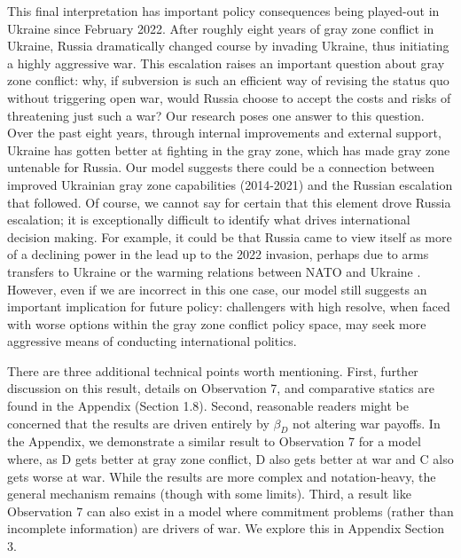 \documentclass[11pt,letterpaper,pdftex,dvipsnames,table]{article}
\begin{document}
This final interpretation has important policy consequences being played-out in Ukraine since February 2022. After roughly eight years of gray zone conflict in Ukraine, Russia dramatically changed course by invading Ukraine, thus initiating a highly aggressive war. This escalation raises an important question about gray zone conflict: why, if subversion is such an efficient way of revising the status quo without triggering open war, would Russia choose to accept the costs and risks of threatening just such a war? Our research poses one answer to this question. Over the past eight years, through internal improvements and external support, Ukraine has gotten better at fighting in the gray zone, which has made gray zone untenable for Russia. Our model suggests there could be a connection between improved Ukrainian gray zone capabilities (2014-2021) and the Russian escalation that followed. Of course, we cannot say for certain that this element drove Russia escalation; it is exceptionally difficult to identify what drives international decision making. For example, it could be that Russia came to view itself as more of a declining power in the lead up to the 2022 invasion, perhaps due to arms transfers to Ukraine or the warming relations between NATO and Ukraine \citep{benson_commitmentproblemsalliance_2022}. However, even if we are incorrect in this one case, our model still suggests an important implication for future policy: challengers with high resolve, when faced with worse options within the gray zone conflict policy space, may seek more aggressive means of conducting international politics. 

There are three additional technical points worth mentioning. First, further discussion on this result, details on Observation 7, and comparative statics are found in the Appendix (Section 1.8). Second, reasonable readers might be concerned that the results are driven entirely by $\beta_{D}$ not altering war payoffs. In the Appendix, we demonstrate a similar result to Observation 7 for a model where, as D gets better at gray zone conflict, D also gets better at war and C also gets worse at war. While the results are more complex and notation-heavy, the general mechanism remains (though with some limits). Third, a result like Observation 7 can also exist in a model where commitment problems (rather than incomplete information) are drivers of war. We explore this in Appendix Section 3.
\end{document}
